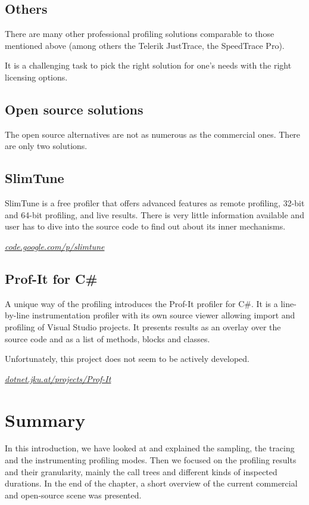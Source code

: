 \subsection{Others}
There are many other professional profiling solutions comparable to those mentioned above (among others the Telerik JustTrace, the SpeedTrace Pro).

It is a challenging task to pick the right solution for one's needs with the right licensing options.

\subsection*{Open source solutions}
The open source alternatives are not as numerous as the commercial ones. There are only two solutions.

\subsection{SlimTune}
SlimTune is a free profiler that offers advanced features as remote profiling, 32-bit and 64-bit profiling, and live results. There is very little information available and user has to dive into the source code to find out about its inner mechanisms.

\textit{\href{http://code.google.com/p/slimtune}{code.google.com/p/slimtune}}

\subsection{Prof-It for C\#}
A unique way of the profiling introduces the Prof-It profiler for C\#. It is a line-by-line instrumentation profiler with its own source viewer allowing import and profiling of Visual Studio projects. It presents results as an overlay over the source code and as a list of methods, blocks and classes. 

Unfortunately, this project does not seem to be actively developed. 

\textit{\href{http://dotnet.jku.at/projects/Prof-It/}{dotnet.jku.at/projects/Prof-It}}

\section*{Summary}
In this introduction, we have looked at and explained the sampling, the tracing and the instrumenting profiling modes. Then we focused on the profiling results and their granularity, mainly the call trees and different kinds of inspected durations. In the end of the chapter, a short overview of the current commercial and open-source scene was presented.

 

